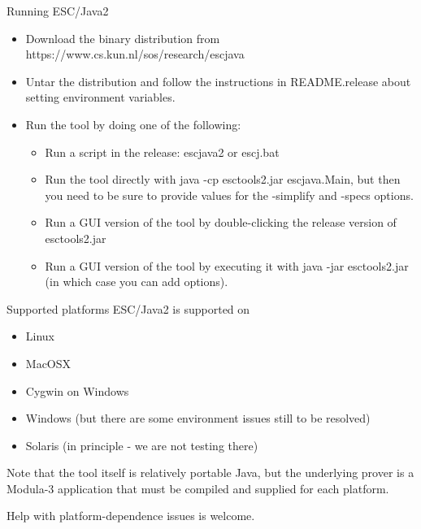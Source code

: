 \documentclass[
pdf,
nocolorBG,
slideColor,
cok,
]{prosper}
\begin{document}


\begin{slide}{Running ESC/Java2}
\vspace*{-6ex}
\begin{itemize}
\item Download the binary distribution from {\green https://www.cs.kun.nl/sos/research/escjava}
\item Untar the distribution and follow the instructions in {\green README.release} about setting environment variables.
\item Run the tool by doing one of the following:
\begin{itemize}
\item Run a script in the release: {\green escjava2} or {\green escj.bat}
\item Run the tool directly with {\green java -cp esctools2.jar escjava.Main}, but then you need to be sure to provide values for the {\blue -simplify} and {\blue -specs}  options.
\item Run a GUI version of the tool by double-clicking the release version of {\green esctools2.jar}
\item Run a GUI version of the tool by executing it with {\green java -jar esctools2.jar} (in which case you can add options).
\end{itemize}
\end{itemize}
\end{slide}



\begin{slide}{Supported platforms}
\vspace*{-6ex}
ESC/Java2 is supported on
\begin{itemize}
\item Linux
\item MacOSX
\item Cygwin on Windows
\item Windows (but there are some environment issues still to be resolved)
\item Solaris (in principle - we are not testing there)
\end{itemize}
Note that the tool itself is relatively portable Java, but the underlying prover is a Modula-3 application that must be compiled and supplied for each platform.

Help with platform-dependence issues is welcome.
\end{slide}
\end{document}
